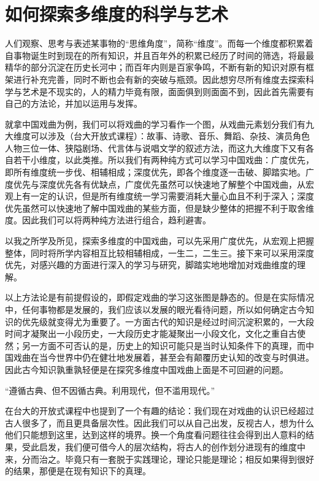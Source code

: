 \section{如何探索多维度的科学与艺术}
人们观察、思考与表述某事物的“思维角度”，简称“维度”。而每一个维度都积累着自事物诞生时到现在的所有知识，并且百年外的积累已经历了时间的筛选，将最最精华的部分沉淀在历史长河中；而百年内则是百家争鸣，不断有新的知识对原有框架进行补充完善，同时不断也会有新的突破与瓶颈。因此想穷尽所有维度去探索科学与艺术是不现实的，人的精力毕竟有限，面面俱到则面面不到，因此首先需要有自己的方法论，并加以运用与发挥。

就拿中国戏曲为例，我们可以将戏曲的学习看作一个图，从戏曲元素划分我们有九大维度可以涉及（台大开放式课程）：故事、诗歌、音乐、舞蹈、杂技、演员角色人物三位一体、狭隘剧场、代言体与说唱文学的叙述方法，而这九大维度下又有各自若干小维度，以此类推。所以我们有两种纯方式可以学习中国戏曲：广度优先，即所有维度统一步伐、相辅相成；深度优先，即各个维度逐一击破、脚踏实地。广度优先与深度优先各有优缺点，广度优先虽然可以快速地了解整个中国戏曲，从宏观上有一定的认识，但是所有维度统一学习需要消耗大量心血且不利于深入；深度优先虽然可以快速地了解中国戏曲的某些方面，但是缺少整体的把握不利于取舍维度。因此我们可以将两种纯方法进行组合，趋利避害。

以我之所学及所见，探索多维度的中国戏曲，可以先采用广度优先，从宏观上把握整体，同时将所学内容相互比较相辅相成，一生二，二生三。接下来可以采用深度优先，对感兴趣的方面进行深入的学习与研究，脚踏实地地增加对戏曲维度的理解。

以上方法论是有前提假设的，即假定戏曲的学习这张图是静态的。但是在实际情况中，任何事物都是发展的，我们应该以发展的眼光看待问题，所以如何确定古今知识的优先级就变得尤为重要了。一方面古代的知识是经过时间沉淀积累的，一大段时间才凝聚出一小段历史，一大段历史才能凝聚出一小段文化，文化之重自古使然；另一方面不可否认的是，历史上的知识可能只是当时认知条件下的真理，而中国戏曲在当今世界中仍在健壮地发展着，甚至会有颠覆历史认知的改变与时俱进。因此古今知识孰重孰轻便是在探究多维度中国戏曲上面是不可回避的问题。

“遵循古典、但不因循古典。利用现代，但不滥用现代。”

在台大的开放式课程中也提到了一个有趣的结论：我们现在对戏曲的认识已经超过古人很多了，而且更具备层次性。因此我们可以从自己出发，反视古人，想为什么他们只能想到这里，达到这样的境界。换一个角度看问题往往会得到出人意料的结果，受此启发，我们便可借今人的层次结构，将古人的创作划分进现有的维度中来，分而治之。毕竟只有一套脱于实践理论，理论只能是理论；相反如果得到很好的结果，那便是在现有知识下的真理。


